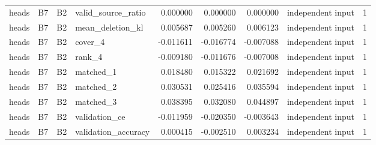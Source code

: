 \begin{tabular}{llllrrrlr}
heads & B7 & B2 & valid_source_ratio & 0.000000 & 0.000000 & 0.000000 & independent input & 1 \\
heads & B7 & B2 & mean_deletion_kl & 0.005687 & 0.005260 & 0.006123 & independent input & 1 \\
heads & B7 & B2 & cover_4 & -0.011611 & -0.016774 & -0.007088 & independent input & 1 \\
heads & B7 & B2 & rank_4 & -0.009180 & -0.011676 & -0.007008 & independent input & 1 \\
heads & B7 & B2 & matched_1 & 0.018480 & 0.015322 & 0.021692 & independent input & 1 \\
heads & B7 & B2 & matched_2 & 0.030531 & 0.025416 & 0.035594 & independent input & 1 \\
heads & B7 & B2 & matched_3 & 0.038395 & 0.032080 & 0.044897 & independent input & 1 \\
heads & B7 & B2 & validation_ce & -0.011959 & -0.020350 & -0.003643 & independent input & 1 \\
heads & B7 & B2 & validation_accuracy & 0.000415 & -0.002510 & 0.003234 & independent input & 1 \\
\bottomrule
\end{tabular}
